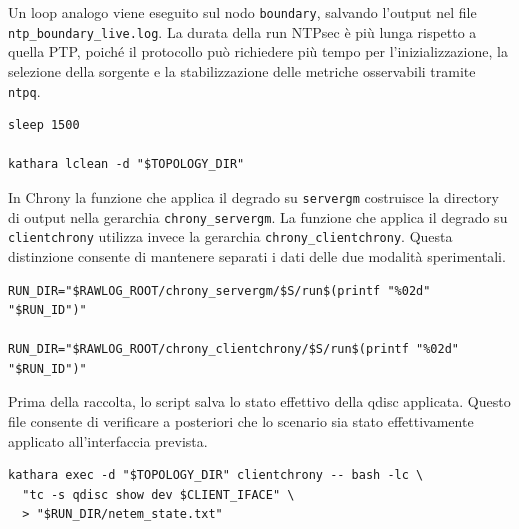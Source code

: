 Un loop analogo viene eseguito sul nodo \texttt{boundary}, salvando l'output nel file
\texttt{ntp\_boundary\_live.log}. La durata della run NTPsec è più lunga rispetto
a quella PTP, poiché il protocollo può richiedere più tempo per l'inizializzazione,
la selezione della sorgente e la stabilizzazione delle metriche osservabili tramite
\texttt{ntpq}.

\begin{listing}[H]
\begin{verbatim}
sleep 1500

kathara lclean -d "$TOPOLOGY_DIR"
\end{verbatim}
\caption{Durata della fase di raccolta NTPsec.}
\label{lst:auto-ntpsec-sleep}
\end{listing}

\begin{sloppypar}
  In Chrony la funzione che applica il degrado su \texttt{servergm} costruisce la
  directory di output nella gerarchia \texttt{chrony\_servergm}. La funzione che
  applica il degrado su \texttt{clientchrony} utilizza invece la gerarchia \texttt{chrony\_clientchrony}.
  Questa distinzione consente di mantenere separati i dati delle due modalità sperimentali.
\end{sloppypar}

\begin{listing}[H]
\begin{verbatim}
RUN_DIR="$RAWLOG_ROOT/chrony_servergm/$S/run$(printf "%02d" "$RUN_ID")"

RUN_DIR="$RAWLOG_ROOT/chrony_clientchrony/$S/run$(printf "%02d" "$RUN_ID")"
\end{verbatim}
\caption{Directory di output per le due modalità Chrony.}
\label{lst:auto-chrony-dirs}
\end{listing}

Prima della raccolta, lo script salva lo stato effettivo della qdisc applicata.
Questo file consente di verificare a posteriori che lo scenario sia stato
effettivamente applicato all'interfaccia prevista.

\begin{listing}[H]
\begin{verbatim}
kathara exec -d "$TOPOLOGY_DIR" clientchrony -- bash -lc \
  "tc -s qdisc show dev $CLIENT_IFACE" \
  > "$RUN_DIR/netem_state.txt"
\end{verbatim}
\caption{Salvataggio dello stato della qdisc in una run Chrony.}
\label{lst:auto-chrony-qdisc-state}
\end{listing}

